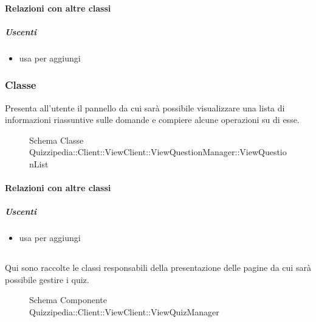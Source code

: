 \paragraph{Relazioni con altre classi}
\subparagraph{Uscenti}
\begin{itemize}
\item usa  per aggiungi
\end{itemize}
\subsubsection{Classe }
Presenta all'utente il pannello da cui sarà possibile visualizzare una lista di informazioni riassuntive sulle domande e compiere alcune operazioni su di esse.
\begin{figure}[H]
\centering
\noindent{}
\caption[Schema Classe ViewQuestionList]{Schema Classe Quizzipedia::Client::ViewClient::ViewQuestionManager::ViewQuestionList}
\end{figure}
\paragraph{Relazioni con altre classi}
\subparagraph{Uscenti}
\begin{itemize}
\item usa  per aggiungi
\end{itemize}
\subsection{}
Qui sono raccolte le classi responsabili della presentazione delle pagine da cui sarà possibile gestire i quiz.
\begin{figure}[H]
\centering
\noindent{}
\caption[Schema Componente Quizzipedia::Client::ViewClient::ViewQuizManager]{Schema Componente Quizzipedia::Client::ViewClient::ViewQuizManager}
\end{figure}
